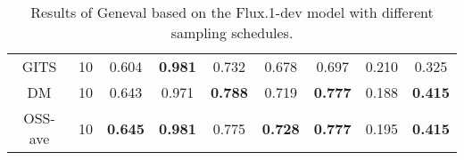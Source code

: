 \documentclass[10pt,twocolumn,letterpaper]{article}
\begin{document}
\begin{table*}[htbp]
\begin{tabular}{ccc|cccccc}
    \textcolor[rgb]{0.2,0.2,0.2}{GITS}     & 10  & \textcolor[rgb]{0.2,0.2,0.2}{0.604}          & \textcolor[rgb]{0.2,0.2,0.2}{\textbf{0.981}}                                                                         & \textcolor[rgb]{0.2,0.2,0.2}{0.732}                                                                               & \textcolor[rgb]{0.2,0.2,0.2}{0.678}          & \textcolor[rgb]{0.2,0.2,0.2}{0.697}          & \textcolor[rgb]{0.2,0.2,0.2}{0.210} & \textcolor[rgb]{0.2,0.2,0.2}{0.325}                                                                                       \\
    \textcolor[rgb]{0.2,0.2,0.2}{DM}     & 10  & \textcolor[rgb]{0.2,0.2,0.2}{0.643}          & \textcolor[rgb]{0.2,0.2,0.2}{0.971}                                                                         & \textcolor[rgb]{0.2,0.2,0.2}{\textbf{0.788}}                                                                               & \textcolor[rgb]{0.2,0.2,0.2}{0.719}          & \textcolor[rgb]{0.2,0.2,0.2}{\textbf{0.777}}          & \textcolor[rgb]{0.2,0.2,0.2}{0.188} & \textcolor[rgb]{0.2,0.2,0.2}{\textbf{0.415}}                                                                                       \\
    
    \textcolor[rgb]{0.2,0.2,0.2}{OSS-ave}     & 10  & \textcolor[rgb]{0.2,0.2,0.2}{\textbf{0.645}} & \textcolor[rgb]{0.2,0.2,0.2}{\textbf{0.981}}                                                                         & \textcolor[rgb]{0.2,0.2,0.2}{0.775}                                                                     & \textcolor[rgb]{0.2,0.2,0.2}{\textbf{0.728}} & \textcolor[rgb]{0.2,0.2,0.2}{\textbf{0.777}} & \textcolor[rgb]{0.2,0.2,0.2}{0.195}          & \textcolor[rgb]{0.2,0.2,0.2}{\textbf{0.415}}                                                                              \\
    \bottomrule
    \end{tabular}
    \vspace{-0.2cm}
    \caption{Results of Geneval based on the Flux.1-dev model with different sampling schedules.}
    \label{table:geneval}
    \end{table*}
\end{document}
